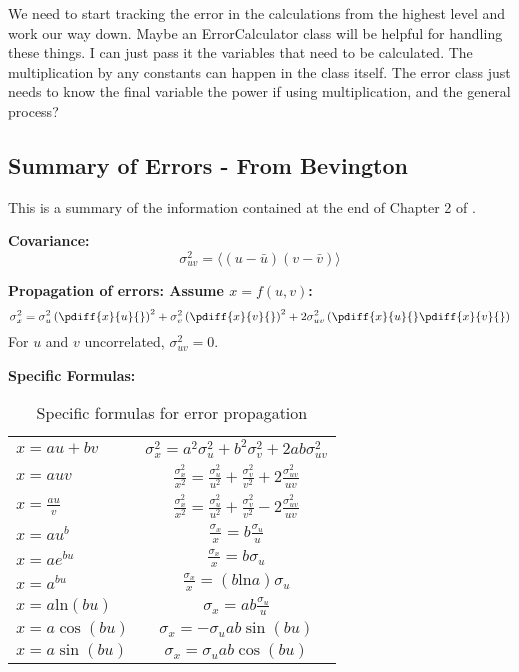 We need to start tracking the error in the calculations from the highest level 
and work our way down. Maybe an ErrorCalculator class will be helpful for 
handling these things. I can just pass it the variables that need to be 
calculated. The multiplication by any constants can happen in the class itself.
The error class just needs to know the final variable the power if 
using multiplication, and the general process?

\subsection{Summary of Errors - From Bevington}
This is a summary of the information contained at the end of Chapter 2 of 
\cite{bevington2003}.

\noindent \textbf{Covariance:} 
\begin{equation}
\sigma_{uv}^2 = \langle(u-\bar{u})(v-\bar{v})\rangle
\end{equation}

\noindent \textbf{Propagation of errors: Assume $x=f(u,v)$:}
\begin{equation}
\sigma^2_x = \sigma_u^2\left(\pdiff{x}{u}{}\right)^2 +
   \sigma_v^2\left(\pdiff{x}{v}{}\right)^2 + 
   2\sigma_{uv}^2\left(\pdiff{x}{u}{}\pdiff{x}{v}{}\right)
\end{equation}
For $u$ and $v$ uncorrelated, $\sigma_{uv}^2 = 0$.

\noindent \textbf{Specific Formulas:}
\begin{table}[h]
  \begin{center}
    \begin{tabular}{l c}
      $x=au+bv$ & $\sigma_x^2 = a^2\sigma_u^2+b^2\sigma_v^2 + 2ab\sigma_{uv}^2$ \\
      $x=auv$ & $\frac{\sigma_x^2}{x^2} = \frac{\sigma_u^2}{u^2} + 
         \frac{\sigma_v^2}{v^2}+2\frac{\sigma_{uv}^2}{uv} $ \\
      $x=\frac{au}{v}$ & $\frac{\sigma_x^2}{x^2} = \frac{\sigma_u^2}{u^2} + 
         \frac{\sigma_v^2}{v^2}-2\frac{\sigma_{uv}^2}{uv} $ \\
      $x=au^b$ & $\frac{\sigma_x}{x} = b\frac{\sigma_u}{u}$ \\
      $x=ae^{bu}$ & $\frac{\sigma_x}{x} = b\sigma_u$ \\
      $x=a^{bu}$ & $\frac{\sigma_x}{x} = (b \mathrm{ln} a) \sigma_u$ \\
      $x=a\mathrm{ln}(bu)$ & $\sigma_x = ab\frac{\sigma_u}{u}$ \\
      $x=a \cos(bu)$ & $\sigma_x = -\sigma_uab\sin(bu)$ \\
      $x=a \sin(bu)$ & $\sigma_x = \sigma_uab\cos(bu)$ \\
    \end{tabular}
  \end{center}
  \caption{Specific formulas for error propagation}
  \label{tbl:errFormulas}
\end{table}


